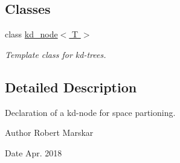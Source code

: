 \subsection*{Classes}
\begin{DoxyCompactItemize}
\item 
class \hyperlink{classkd__node}{kd\+\_\+node$<$ T $>$}
\begin{DoxyCompactList}\small\item\em Template class for kd-\/trees. \end{DoxyCompactList}\end{DoxyCompactItemize}


\subsection{Detailed Description}
Declaration of a kd-\/node for space partioning. 

\begin{DoxyAuthor}{Author}
Robert Marskar 
\end{DoxyAuthor}
\begin{DoxyDate}{Date}
Apr. 2018 
\end{DoxyDate}
